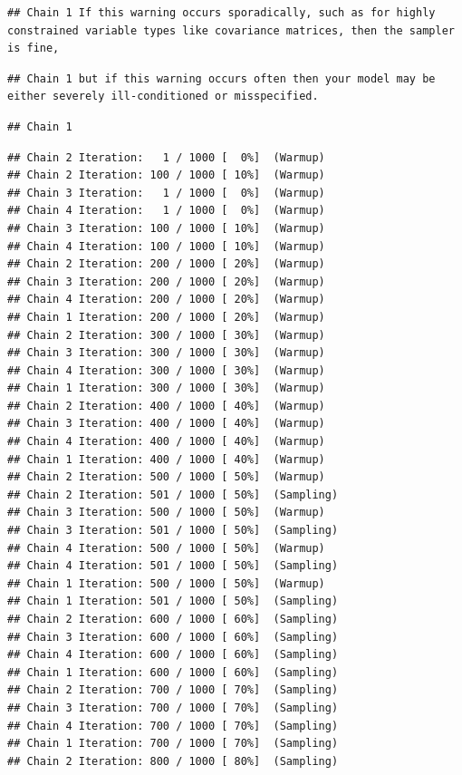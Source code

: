 \documentclass[
]{book}
\begin{document}
\begin{verbatim}
## Chain 1 If this warning occurs sporadically, such as for highly constrained variable types like covariance matrices, then the sampler is fine,
\end{verbatim}

\begin{verbatim}
## Chain 1 but if this warning occurs often then your model may be either severely ill-conditioned or misspecified.
\end{verbatim}

\begin{verbatim}
## Chain 1
\end{verbatim}

\begin{verbatim}
## Chain 2 Iteration:   1 / 1000 [  0%]  (Warmup) 
## Chain 2 Iteration: 100 / 1000 [ 10%]  (Warmup) 
## Chain 3 Iteration:   1 / 1000 [  0%]  (Warmup) 
## Chain 4 Iteration:   1 / 1000 [  0%]  (Warmup) 
## Chain 3 Iteration: 100 / 1000 [ 10%]  (Warmup) 
## Chain 4 Iteration: 100 / 1000 [ 10%]  (Warmup) 
## Chain 2 Iteration: 200 / 1000 [ 20%]  (Warmup) 
## Chain 3 Iteration: 200 / 1000 [ 20%]  (Warmup) 
## Chain 4 Iteration: 200 / 1000 [ 20%]  (Warmup) 
## Chain 1 Iteration: 200 / 1000 [ 20%]  (Warmup) 
## Chain 2 Iteration: 300 / 1000 [ 30%]  (Warmup) 
## Chain 3 Iteration: 300 / 1000 [ 30%]  (Warmup) 
## Chain 4 Iteration: 300 / 1000 [ 30%]  (Warmup) 
## Chain 1 Iteration: 300 / 1000 [ 30%]  (Warmup) 
## Chain 2 Iteration: 400 / 1000 [ 40%]  (Warmup) 
## Chain 3 Iteration: 400 / 1000 [ 40%]  (Warmup) 
## Chain 4 Iteration: 400 / 1000 [ 40%]  (Warmup) 
## Chain 1 Iteration: 400 / 1000 [ 40%]  (Warmup) 
## Chain 2 Iteration: 500 / 1000 [ 50%]  (Warmup) 
## Chain 2 Iteration: 501 / 1000 [ 50%]  (Sampling) 
## Chain 3 Iteration: 500 / 1000 [ 50%]  (Warmup) 
## Chain 3 Iteration: 501 / 1000 [ 50%]  (Sampling) 
## Chain 4 Iteration: 500 / 1000 [ 50%]  (Warmup) 
## Chain 4 Iteration: 501 / 1000 [ 50%]  (Sampling) 
## Chain 1 Iteration: 500 / 1000 [ 50%]  (Warmup) 
## Chain 1 Iteration: 501 / 1000 [ 50%]  (Sampling) 
## Chain 2 Iteration: 600 / 1000 [ 60%]  (Sampling) 
## Chain 3 Iteration: 600 / 1000 [ 60%]  (Sampling) 
## Chain 4 Iteration: 600 / 1000 [ 60%]  (Sampling) 
## Chain 1 Iteration: 600 / 1000 [ 60%]  (Sampling) 
## Chain 2 Iteration: 700 / 1000 [ 70%]  (Sampling) 
## Chain 3 Iteration: 700 / 1000 [ 70%]  (Sampling) 
## Chain 4 Iteration: 700 / 1000 [ 70%]  (Sampling) 
## Chain 1 Iteration: 700 / 1000 [ 70%]  (Sampling) 
## Chain 2 Iteration: 800 / 1000 [ 80%]  (Sampling) 

\end{verbatim}
\end{document}
